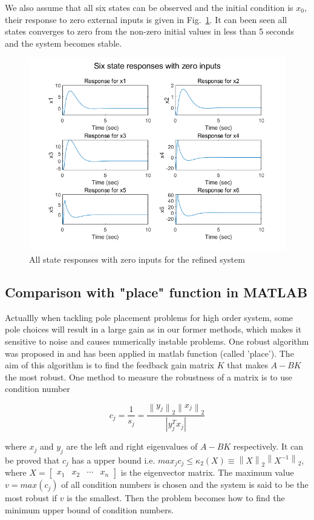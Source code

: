 \documentclass[hyperref]{article}
\theoremstyle{nonumberplain}
\begin{document}
	We also assume that all six states can be observed and the initial condition is $x_{0}$, their response to zero external inputs is given in Fig.~\ref{fig5}. It can been seen all states converges to zero from the non-zero initial values in less than 5 seconds and the system becomes stable.
	
	\begin{figure}[H]
		\centering
		\includegraphics[width=0.6\linewidth]{fig39.png}
		\caption{All state responses with zero inputs for the refined system}
		\label{fig5}
	\end{figure} 
	
	\subsection{Comparison with "place" function in MATLAB}
	
	\hspace{1.0em}
	Actuallly when tackling pole placement problems for high order system, some pole choices will result in a large gain as in our former methods, which makes it sensitive to noise and causes numerically instable problems. One robust algorithm was proposed in \cite{kautsky1985robust} and has been applied in matlab function (called 'place'). The aim of this algorithm is to find the feedback gain matrix $K$ that makes $A-BK$ the most robust. One method to measure the robustness of a matrix is to use condition number
	
	\begin{equation}
	c_{j}=\frac{1}{s_{j}}=\frac{\left \| y_{j} \right \|_{2} \left \| x_{j} \right \|_{2}}{\left |y_{j}^{T} x_{j}  \right |}
	\label{eq16}
	\end{equation}
	
	where $x_{j}$ and $y_{j}$ are the left and right eigenvalues of $A-BK$ respectively. It can be proved that $c_{j}$ has a upper bound i.e. $max_{j}c_{j} \leq \kappa _{2}(X)\equiv \left \| X \right \|_{2}\left \| X^{-1} \right \|_{2}$, where $X=\begin{bmatrix}
	x_{1} &x_{2}  &\cdots   & x_{n}
	\end{bmatrix}$ is the eigenvector matrix. The maximum value $v=max(c_{j})$ of all condition numbers is chosen and the system is said to be the most robust if $v$ is the smallest. Then the problem becomes how to find the minimum upper bound of condition numbers.
	
\end{document}
